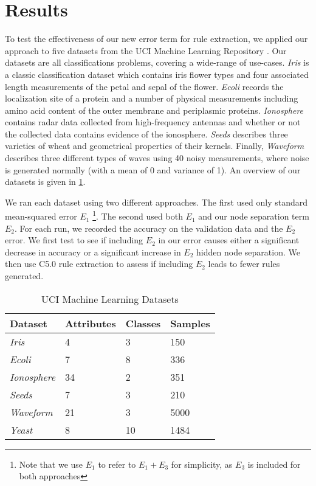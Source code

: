 \section{Results}
\label{sec:results}

To test the effectiveness of our new error term for rule extraction,
we applied our approach to five 
datasets from the UCI Machine Learning Repository \cite{uci}. Our
datasets are all classifications problems, covering a wide-range of
use-cases. \textit{Iris} is a classic classification dataset which
contains iris flower types and four associated length
measurements of the petal and sepal of the flower. \textit{Ecoli}
records the localization site of a protein and a number of
physical measurements including amino acid content of the outer membrane
and periplasmic proteins. \textit{Ionosphere} contains radar data collected
from high-frequency antennas and whether or not the collected data
contains evidence of the ionosphere. \textit{Seeds} describes three
varieties of wheat and geometrical properties of their kernels.
Finally, \textit{Waveform} describes three different types of waves
using 40 noisy measurements, where noise is generated normally
(with a mean of 0 and variance of 1). 
An overview of our datasets is given in \ref{tab:datasets}.

We ran each dataset using two different approaches. The first
used only standard mean-squared error $E_1$
\footnote{Note that we use $E_1$ to refer to $E_1+E_3$ for simplicity, as
$E_3$ is included for both approaches}. The second used both
$E_1$ and our node separation term $E_2$. For each run, we recorded
the accuracy on the validation data and the $E_2$ error.
We first test to see if including $E_2$ in our error causes either
a significant decrease in accuracy or a significant increase
in $E_2$ hidden node separation. We then use C5.0 rule extraction
to assess if including $E_2$ leads to fewer rules generated.

\begin{table}[]
  \centering
\begin{tabular}{@{}llll@{}}
\toprule
Dataset             & Attributes & Classes & Samples \\ \midrule
\textit{Iris}       & 4          & 3       & 150     \\
\textit{Ecoli}      & 7          & 8       & 336     \\
\textit{Ionosphere} & 34         & 2       & 351     \\
\textit{Seeds}      & 7          & 3       & 210     \\
\textit{Waveform}   & 21         & 3       & 5000    \\ 
\textit{Yeast}      & 8          & 10      & 1484    \\ \bottomrule
\end{tabular}
\caption{UCI Machine Learning Datasets}
\label{tab:datasets}
\end{table}

